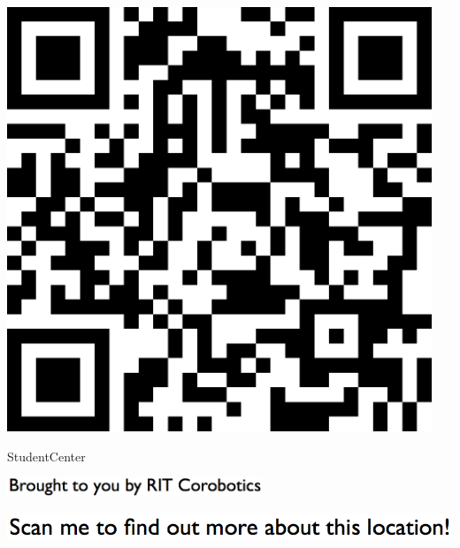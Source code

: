 \documentclass[letterpaper]{article}
\begin{document}
 \begingroup 
 \centerline{\includegraphics[scale=1,width=5in,height=5in]{StudentCenter.png}} 
 \endgroup 
 \vspace*{\fill} 

 \hfill{\small StudentCenter} 

  \vspace{0.7in} 
 
 \centerline{\includegraphics[scale=1,width=3in]{text-bottom.png}} 
 
 \pagebreak 
{} 
 \vspace*{\fill} 
 
  \centerline{\includegraphics[scale=1,width=6in]{text-top.png}} 
 
 \vspace{0.5in} 
 
\end{document}
